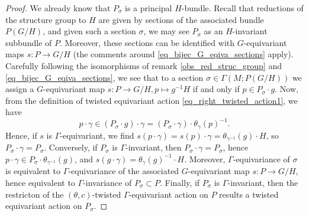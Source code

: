 \begin{proof}
    We already know that \(P_\sigma\) is a principal \(H\)-bundle. Recall that reductions of the structure group to \(H\) are given by sections of the associated bundle \(P(G/H)\), and given such a section \(\sigma\), we may see \(P_\sigma\) as an \(H\)-invariant subbundle of \(P\). Moreover, these sections can be identified with \(G\)-equivariant maps \(s\colon P\to G/H\) (the comments around \eqref{eq_bijec_G_eqiva_sections} apply). Carefully following the isomorphisms of remark \ref{obs_red_struc_group} and \eqref{eq_bijec_G_eqiva_sections}, we see that to a section \(\sigma\in \Gamma(M;P(G/H))\) we assign a \(G\)-equivariant map \(s\colon P \to G/H, p \mapsto g^{-1}H\) if and only if \(p \in P_\sigma \cdot g\). Now, from the definition of twisted equivariant action \eqref{eq_right_twisted_action1}, we have 
    \[
    p\cdot \gamma\in (P_\sigma\cdot  g)\cdot \gamma = (P_\sigma \cdot \gamma)\cdot \theta_\gamma(p)^{-1}.
    \]
    Hence, if \(s\) is \(\Gamma\)-equivariant, we find \(s(p\cdot \gamma)=s(p)\cdot \gamma = \theta_{\gamma^{-1}}(g)\cdot H\), so \(P_\sigma\cdot \gamma=P_\sigma\). Conversely, if \(P_\sigma\) is \(\Gamma\)-invariant, then \(P_\sigma\cdot \gamma=P_\sigma\), hence \(p\cdot \gamma\in P_\sigma \cdot \theta_{\gamma^{-1}}(g)\), and \(s(g\cdot \gamma)=\theta_{\gamma}(g)^{-1}\cdot H\). Moreover, \(\Gamma\)-equivariance of \(\sigma\) is equivalent to \(\Gamma\)-equivariance of the associated \(G\)-equivariant map \(s\colon P\to G/H\), hence equivalent to \(\Gamma\)-invariance of \(P_\sigma\subset P\). Finally, if \(P_\sigma\) is \(\Gamma\)-invariant, then the restricton of the \((\theta,c)\)-twisted \(\Gamma\)-equivariant action on \(P\) results a twisted equivariant action on \(P_\sigma\).
\end{proof}

